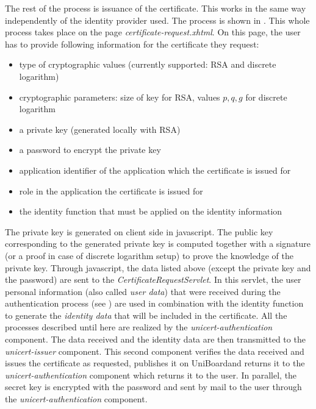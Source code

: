 \documentclass[oneside]{scrreprt}
\newcommand{\uniboard}{\mbox{UniBoard}}
\begin{document}
The rest of the process is issuance of the certificate. This works in the same way independently of the identity provider used. The process is shown in . This whole process takes place on the page \textit{certificate-request.xhtml}. On this page, the user has to provide following information for the certificate they request: 
\begin{itemize}
\item type of cryptographic values (currently supported: RSA and discrete logarithm)
\item cryptographic parameters: size of key for RSA, values $p,q,g$ for discrete logarithm
\item a private key (generated locally with RSA)
\item a password to encrypt the private key
\item application identifier of the application which the certificate is issued for
\item role in the application the certificate is issued for
\item the identity function that must be applied on the identity information
\end{itemize}

The private key is generated on client side in javascript. The public key corresponding to the generated private key is computed together with a signature (or a proof in case of discrete logarithm setup) to prove the knowledge of the private key. Through javascript, the data listed above (except the private key and the password) are sent to the \textit{CertificateRequestServlet}. In this servlet, the user personal information (also called \textit{user data}) that were received during the authentication process (see ) are used in combination with the identity function to generate the \textit{identity data} that will be included in the certificate. All the processes described until here are realized by the \textit{unicert-authentication} component. The data received and the identity data are then transmitted to the \textit{unicert-issuer} component. This second component verifies the data received and issues the certificate as requested, publishes it on \uniboard and returns it to the \textit{unicert-authentication} component which returns it to the user. In parallel, the secret key is encrypted with the password and sent by mail to the user through the \textit{unicert-authentication} component.
\end{document}
